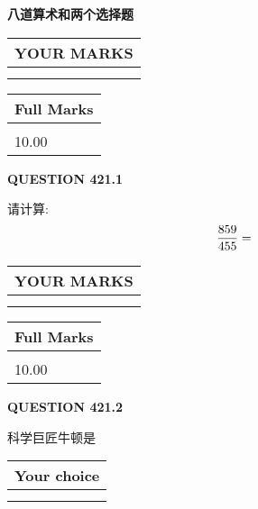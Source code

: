 \documentclass{ctexart}
\begin{document}
   
 \vspace{0.2in}
{\LARGE {\textbf{ 八道算术和两个选择题}}}
   
   
  
\vspace{0.2in}
  
\noindent\begin{tabular}{|l|}
\hline
 YOUR MARKS  \\
\hline
 \\ 
 \\ 
\hline
\end{tabular}
\hspace{0.05in} \begin{tabular}{|l|}
\hline
 Full Marks  \\
\hline
 \\ 
10.00 \\
\hline
\end{tabular}
{\textbf{\Large{QUESTION
421.1 
}}}
  
  
 
请计算:
\begin{equation}
\frac { %
859 }  {  %
455} = \nonumber
\end{equation}
 

 

 
  
\vspace{0.2in}
  
\noindent\begin{tabular}{|l|}
\hline
 YOUR MARKS  \\
\hline
 \\ 
 \\ 
\hline
\end{tabular}
\hspace{0.05in} \begin{tabular}{|l|}
\hline
 Full Marks  \\
\hline
 \\ 
10.00 \\
\hline
\end{tabular}
{\textbf{\Large{QUESTION
421.2 
}}}
  
  
科学巨匠牛顿是
  
  
\noindent\hspace{3.0in} \begin{tabular}{|l|}
\hline
Your choice \\
\hline
 \\ 
 \\ 
\hline
\end{tabular}
  
\end{document}

